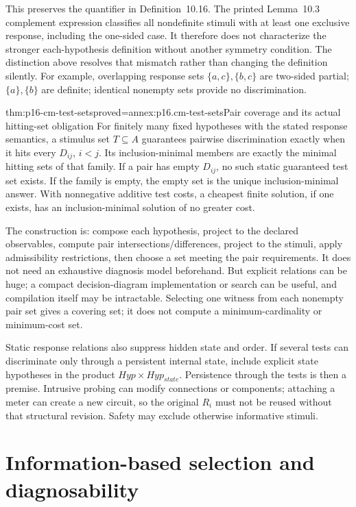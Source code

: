 This preserves the quantifier in Definition~10.16. The printed Lemma~10.3
complement expression classifies all nondefinite stimuli with at least one
exclusive response, including the one-sided case. It therefore does not
characterize the stronger each-hypothesis definition without another symmetry
condition. The distinction above resolves that mismatch rather than changing
the definition silently. For example, overlapping response sets
\(\{a,c\},\{b,c\}\) are two-sided partial; \(\{a\},\{b\}\)
are definite; identical nonempty sets provide no discrimination.

\begin{hbtheorem}{thm:p16-cm-test-sets}{proved=annex:p16.cm-test-sets}{Pair coverage and its actual hitting-set obligation}
For finitely many fixed hypotheses with the stated response semantics,
a stimulus set \(T\subseteq A\) guarantees pairwise discrimination
exactly when it hits every \(D_{ij}\), \(i<j\). Its inclusion-minimal
members are exactly the minimal hitting sets of that family. If a pair has
empty \(D_{ij}\), no such static guaranteed test set exists. If the family
is empty, the empty set is the unique inclusion-minimal answer. With
nonnegative additive test costs, a cheapest finite solution, if one exists,
has an inclusion-minimal solution of no greater cost.
\end{hbtheorem}

The construction is: compose each hypothesis, project to the declared
observables, compute pair intersections/differences, project to the stimuli,
apply admissibility restrictions, then choose a set meeting the pair
requirements. It does not need an exhaustive diagnosis model beforehand.
But explicit relations can be huge; a compact decision-diagram implementation
or search can be useful, and compilation itself may be intractable.
Selecting one witness from each nonempty pair set gives a covering set;
it does not compute a minimum-cardinality or minimum-cost set.

Static response relations also suppress hidden state and order. If several
tests can discriminate only through a persistent internal state, include
explicit state hypotheses in the product \(Hyp\times Hyp_{state}\).
Persistence through the tests is then a premise. Intrusive probing can modify
connections or components; attaching a meter can create a new circuit, so
the original \(R_i\) must not be reused without that structural revision.
Safety may exclude otherwise informative stimuli.

\section{Information-based selection and diagnosability}
\label{sec:p16-cm-information}

